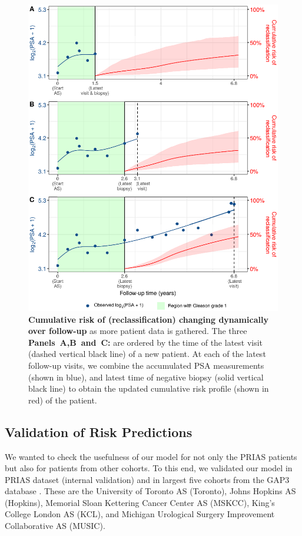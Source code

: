 \begin{figure}
\centerline{\includegraphics[width=\columnwidth]{images/dynrisk_plot_102.eps}}
\caption{\textbf{Cumulative risk of (reclassification) changing dynamically over follow-up} as more patient data is gathered. The three \textbf{Panels~A,B~and~C:} are ordered by the time of the latest visit (dashed vertical black line) of a new patient. At each of the latest follow-up visits, we combine the accumulated PSA measurements (shown in blue), and latest time of negative biopsy (solid vertical black line) to obtain the updated cumulative risk profile (shown in red) of the patient.}
\label{fig:dynrisk_plot_102}
\end{figure}

\clearpage
\subsection{Validation of Risk Predictions}
We wanted to check the usefulness of our model for not only the PRIAS patients but also for patients from other cohorts. To this end, we validated our model in PRIAS dataset (internal validation) and in largest five cohorts from the GAP3 database \citep{gap3_2018}. These are the University of Toronto AS (Toronto), Johns Hopkins AS (Hopkins), Memorial Sloan Kettering Cancer Center AS (MSKCC), King's College London AS (KCL), and Michigan Urological Surgery Improvement Collaborative AS (MUSIC).

